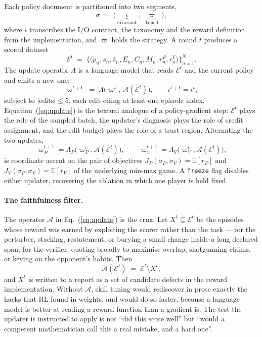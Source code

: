\documentclass{article} %
\begin{document}
Each policy document is partitioned into two segments,
\begin{equation}
\sigma \;=\; \big(\, \underbrace{\iota}_{\text{invariant}} \;,\; \underbrace{\varpi}_{\text{tuned}} \,\big),
\end{equation}
where $\iota$ transcribes the I/O contract, the taxonomy and the reward definition from the
implementation, and $\varpi$ holds the strategy. A round $t$ produces a scored dataset
\begin{equation}
\mathcal{E}^t \;=\; \Big\{\big(p_n, s_n, \hat{s}_n, E_n, C_n, M_n, r^P_n, r^V_n\big)\Big\}_{n=1}^{N}.
\end{equation}
The update operator $\Lambda$ is a language model that reads $\mathcal{E}^t$ and the current
policy and emits a new one:
\begin{equation}
\varpi^{t+1} \;=\; \Lambda\big(\varpi^{t},\, \mathcal{A}(\mathcal{E}^t)\big),
\qquad
\iota^{t+1} = \iota^{t},
\label{eq:update}
\end{equation}
subject to $|\mathrm{edits}| \le 5$, each edit citing at least one episode index. Equation~(\ref{eq:update}) is the textual analogue of a policy-gradient step: $\mathcal{E}^t$ plays
the role of the sampled batch, the updater's diagnosis plays the role of credit assignment,
and the edit budget plays the role of a trust region. Alternating the two updates,
\begin{equation}
\varpi_P^{t+1} = \Lambda_P\big(\varpi_P^{t}, \mathcal{A}(\mathcal{E}^t)\big),
\qquad
\varpi_V^{t+1} = \Lambda_V\big(\varpi_V^{t}, \mathcal{A}(\mathcal{E}^t)\big),
\end{equation}
is coordinate ascent on the pair of objectives
$J_P(\sigma_P,\sigma_V) = \mathbb{E}[r_P]$ and $J_V(\sigma_P,\sigma_V) = \mathbb{E}[r_V]$
of the underlying min-max game. A \texttt{freeze} flag disables either updater, recovering
the ablation in which one player is held fixed.

\paragraph{The faithfulness filter.} The operator $\mathcal{A}$ in Eq.~(\ref{eq:update}) is the
crux. Let $X^t \subseteq \mathcal{E}^t$ be the episodes whose reward was earned by
exploiting the scorer rather than the task --- for the perturber, stacking, restatement, or
burying a small change inside a long declared span; for the verifier, quoting broadly to
maximise overlap, shotgunning claims, or keying on the opponent's habits. Then
\begin{equation}
\mathcal{A}(\mathcal{E}^t) \;=\; \mathcal{E}^t \setminus X^t,
\end{equation}
and $X^t$ is written to a report as a set of candidate defects in the reward implementation.
Without $\mathcal{A}$, skill tuning would rediscover in prose exactly the hacks that RL
found in weights, and would do so faster, because a language model is better at reading a
reward function than a gradient is. The test the updater is instructed to apply is not
``did this score well'' but ``would a competent mathematician call this a real mistake, and
a hard one''.
\end{document}
